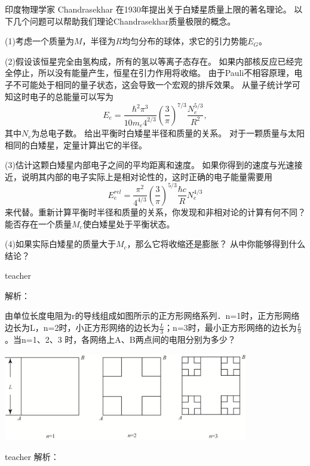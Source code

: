 \begin{example}
	印度物理学家 Chandrasekhar 在1930年提出关于白矮星质量上限的著名理论。
	以下几个问题可以帮助我们理论Chandrasekhar质量极限的概念。
	
	(1)考虑一个质量为$M$，半径为$R$均匀分布的球体，求它的引力势能$E_G$。
	
	(2)假设该恒星完全由氢构成，所有的氢以等离子态存在。
	如果内部核反应已经完全停止，所以没有能量产生，恒星在引力作用将收缩。
	由于Pauli不相容原理，电子不可能处于相同的量子状态，这会导致一个宏观的排斥效果。
	从量子统计学可知这时电子的总能量可以写为
	\[
	E_e = \frac{\hbar^2\pi^3}{10m_e4^{2/3}}\left(\frac{3}{\pi}\right)^{7/3}\frac{N_e^{5/3}}{R^2},
	\]
	其中$N_e$为总电子数。
	给出平衡时白矮星半径和质量的关系。
	对于一颗质量与太阳相同的白矮星，定量计算出它的半径。
	
	(3)估计这颗白矮星内部电子之间的平均距离和速度。
	如果你得到的速度与光速接近，说明其内部的电子实际上是相对论性的，这时正确的电子能量需要用
	\[
	E_e^{rel} = \frac{\pi^2}{4^{4/3}}\left(\frac{3}{\pi}\right)^{5/3}\frac{\hbar c}{R}N_e^{4/3}
	\]
	来代替。重新计算平衡时半径和质量的关系，你发现和非相对论的计算有何不同？
	能否存在一个质量$M_c$使白矮星处于平衡状态。
	
	(4)如果实际白矮星的质量大于$M_c$，那么它将收缩还是膨胀？
	从中你能够得到什么结论？
	
	
	\begin{taggedblock}{teacher}
		
		解析：
	\end{taggedblock}
\end{example}


\begin{example}
由单位长度电阻为r的导线组成如图所示的正方形网络系列．n=1时，正方形网络边长为L，n=2时，小正方形网络的边长为$\frac{L}{3}$；n=3时，最小正方形网络的边长为$\frac{L}{9}$。当n=1、2、3 时，各网络上A、B两点间的电阻分别为多少？
\begin{center}
\includegraphics[width = 0.8\textwidth]{images/problem-7.pdf} 
\end{center}
\begin{taggedblock}{teacher}
解析：
\end{taggedblock}
\end{example}


